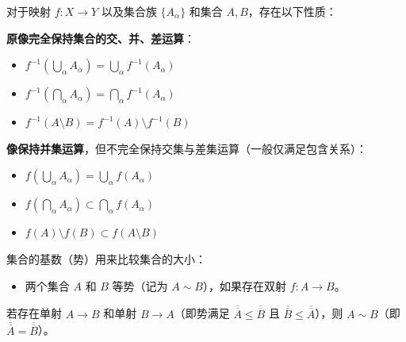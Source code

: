 \begin{theorem}[映射的集合运算法则]

对于映射 $\displaystyle f: X \to Y$ 以及集合族 $\displaystyle \lbrace A_{\alpha} \rbrace$ 和集合 $\displaystyle A, B$，存在以下性质：

\textbf{原像完全保持集合的交、并、差运算}：

\begin{itemize}
  \item {$\displaystyle f^{-1}(\bigcup_{{\alpha}} A_{\alpha}) = \bigcup_{{\alpha}} f^{-1}(A_{\alpha})$

}\item {$\displaystyle f^{-1}(\bigcap_{{\alpha}} A_{\alpha}) = \bigcap_{{\alpha}} f^{-1}(A_{\alpha})$

}\item {$\displaystyle f^{-1}(A \setminus B) = f^{-1}(A) \setminus f^{-1}(B)$

}
\end{itemize}

\textbf{像保持并集运算}，但不完全保持交集与差集运算（一般仅满足包含关系）：

\begin{itemize}
  \item {$\displaystyle f(\bigcup_{{\alpha}} A_{\alpha}) = \bigcup_{{\alpha}} f(A_{\alpha})$

}\item {$\displaystyle f(\bigcap_{{\alpha}} A_{\alpha}) \subset \bigcap_{{\alpha}} f(A_{\alpha})$

}\item {$\displaystyle f(A) \setminus f(B) \subset f(A \setminus B)$

}
\end{itemize}

\end{theorem}

集合的基数（势）用来比较集合的大小：

\begin{itemize}
  \item {两个集合 $A$ 和 $B$ 等势（记为 $A \sim B$），如果存在双射 $f: A \to B$。}
\end{itemize}

\begin{theorem}

若存在单射 $A \to B$ 和单射 $B \to A$（即势满足 $\overline{\overline{A}} \le \overline{\overline{B}}$ 且 $\overline{\overline{B}} \le \overline{\overline{A}}$），则 $A \sim B$（即 $\overline{\overline{A}} = \overline{\overline{B}}$）。

\end{theorem}

